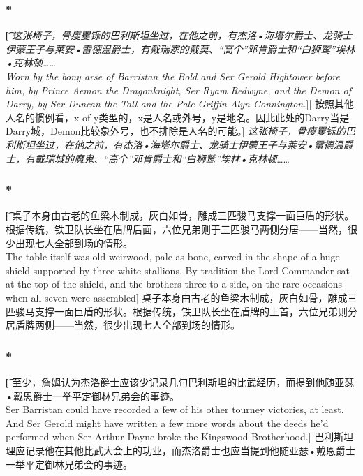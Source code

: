 \documentclass[12pt,a4paper]{article}
\begin{document}
\subsubsection{\color{red}*}\t[
	\emph{这张椅子，骨瘦矍铄的巴利斯坦坐过，在他之前，有杰洛•海塔尔爵士、龙骑士伊蒙王子与莱安•雷德温爵士，有戴瑞家的戴莫、“高个”邓肯爵士和“白狮鹫”埃林•克林顿……\\
	Worn by the bony arse of Barristan the Bold and Ser Gerold Hightower before him, by Prince Aemon the Dragonknight, Ser Ryam Redwyne, and the Demon of Darry, by Ser Duncan the Tall and the Pale Griffin Alyn Connington.}][
	按照其他人名的惯例看，x of y类型的，x是人名或外号，y是地名。因此此处的Darry当是Darry城，Demon比较象外号，也不排除是人名的可能。]
	\emph{这张椅子，骨瘦矍铄的巴利斯坦坐过，在他之前，有杰洛•海塔尔爵士、龙骑士伊蒙王子与莱安•雷德温爵士，有戴瑞城的魔鬼、“高个”邓肯爵士和“白狮鹫”埃林•克林顿}……
	
\subsubsection{\color{red}*}\t[
	 桌子本身由古老的鱼梁木制成，灰白如骨，雕成三匹骏马支撑一面巨盾的形状。根据传统，铁卫队长坐在盾牌后面，六位兄弟则于三匹骏马两侧分居——当然，很少出现七人全部到场的情形。\\
	 The table itself was old weirwood, pale as bone, carved in the shape of a huge shield supported by three white stallions. By tradition the Lord Commander sat at the top of the shield, and the brothers three to a side, on the rare occasions when all seven were assembled]
	 桌子本身由古老的鱼梁木制成，灰白如骨，雕成三匹骏马支撑一面巨盾的形状。根据传统，铁卫队长坐在盾牌的上首，六位兄弟则分居盾牌两侧——当然，很少出现七人全部到场的情形。
\subsubsection{\color{red}*}\t[	 
	至少，詹姆认为杰洛爵士应该少记录几句巴利斯坦的比武经历，而提到他随亚瑟•戴恩爵士一举平定御林兄弟会的事迹。\\
	Ser Barristan could have recorded a few of his other tourney victories, at least. And Ser Gerold might have written a few more words about the deeds he'd performed when Ser Arthur Dayne broke the Kingswood Brotherhood.]
	巴利斯坦理应记录他在其他比武大会上的功业，而杰洛爵士也应当提到他随亚瑟•戴恩爵士一举平定御林兄弟会的事迹。
\end{document}
